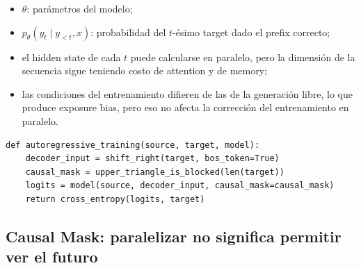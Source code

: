 \begin{itemize}
  \item $\theta$: parámetros del modelo;
  \item $p_{\theta}(y_t\mid y_{<t},x)$: probabilidad del $t$-ésimo target dado el prefix correcto;
  \item el hidden state de cada $t$ puede calcularse en paralelo, pero la dimensión de la secuencia sigue teniendo costo de attention y de memory;
  \item las condiciones del entrenamiento difieren de las de la generación libre, lo que produce exposure bias, pero eso no afecta la corrección del entrenamiento en paralelo.
\end{itemize}




\begin{lstlisting}[caption={Pasos conceptuales de entrenamiento con teacher forcing y causal mask.}]
def autoregressive_training(source, target, model):
    decoder_input = shift_right(target, bos_token=True)
    causal_mask = upper_triangle_is_blocked(len(target))
    logits = model(source, decoder_input, causal_mask=causal_mask)
    return cross_entropy(logits, target)
\end{lstlisting}

\subsection{Causal Mask: paralelizar no significa permitir ver el futuro}


